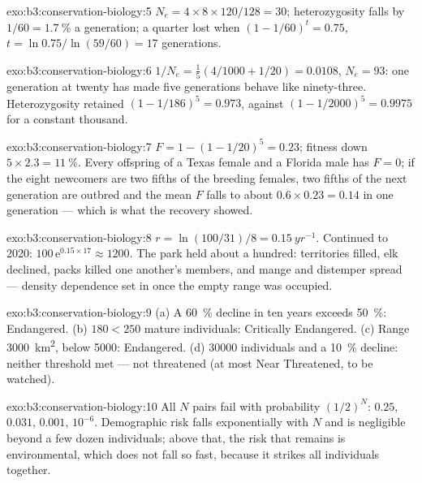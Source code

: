 \begin{solution}{exo:b3:conservation-biology:5}
$N_{e} = 4\times 8\times 120/128 = 30$; heterozygosity falls by $1/60 =
\qty{1.7}{\%}$ a generation; a quarter lost when $(1 - 1/60)^{t} =
0.75$, $t = \ln 0.75/\ln(59/60) = 17$ generations.
\end{solution}

\begin{solution}{exo:b3:conservation-biology:6}
$1/N_{e} = \tfrac{1}{5}(4/1000 + 1/20) = 0.0108$, $N_{e} = 93$: one
generation at twenty has made five generations behave like ninety-three.
Heterozygosity retained $(1 - 1/186)^{5} = 0.973$, against $(1 -
1/2000)^{5} = 0.9975$ for a constant thousand.
\end{solution}

\begin{solution}{exo:b3:conservation-biology:7}
$F = 1 - (1 - 1/20)^{5} = 0.23$; fitness down $5\times 2.3 = \qty{11}{\%}$.
Every offspring of a Texas female and a Florida male has $F = 0$; if the
eight newcomers are two fifths of the breeding females, two fifths of
the next generation are outbred and the mean $F$ falls to about
$0.6\times 0.23 = 0.14$ in one generation --- which is what the
recovery showed.
\end{solution}

\begin{solution}{exo:b3:conservation-biology:8}
$r = \ln(100/31)/8 = \qty{0.15}{yr^{-1}}$. Continued to 2020:
$100\,\mathrm{e}^{0.15\times 17} \approx 1200$. The park held about a
hundred: territories filled, elk declined, packs killed one another's
members, and mange and distemper spread --- density dependence set in
once the empty range was occupied.
\end{solution}

\begin{solution}{exo:b3:conservation-biology:9}
(a) A \qty{60}{\%} decline in ten years exceeds \qty{50}{\%}: Endangered.
(b) $180 < 250$ mature individuals: Critically Endangered. (c) Range
\qty{3000}{km^2}, below \qty{5000}{}: Endangered. (d) \num{30000}
individuals and a \qty{10}{\%} decline: neither threshold met --- not
threatened (at most Near Threatened, to be watched).
\end{solution}

\begin{solution}{exo:b3:conservation-biology:10}
All $N$ pairs fail with probability $(1/2)^{N}$: $0.25$, $0.031$,
$0.001$, $10^{-6}$. Demographic risk falls exponentially with $N$ and
is negligible beyond a few dozen individuals; above that, the risk that
remains is environmental, which does not fall so fast, because it
strikes all individuals together.
\end{solution}

